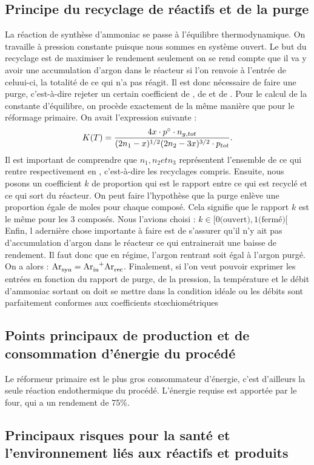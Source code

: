 \subsection{Principe du recyclage de réactifs et de la purge}
La réaction de synthèse d'ammoniac se passe à l'équilibre thermodynamique. On travaille à pression constante puisque nous sommes en système ouvert. Le but du recyclage est de maximiser le rendement seulement on se rend compte que il  va y avoir une accumulation d'argon dans le réacteur si l'on renvoie à l'entrée de celuui-ci, la totalité de ce qui n'a pas réagit. Il est donc nécessaire de faire une purge, c'est-à-dire rejeter un certain coefficient de , de  et de . Pour le calcul de la constante d'équilibre, on procède exactement de la même manière que pour le réformage primaire. 
On avait l'expression suivante : 
$$K(T) = \frac{4x\cdot p^{\circ} \cdot n_{g,tot}}{(2n_1 - x)^{1/2} (2n_2 - 3x)^{3/2} \cdot p_{tot}}.$$
Il est important de comprendre que $n_1, n_2 et n_3$ représentent l'ensemble de ce qui rentre respectivement en , c'est-à-dire les recyclages compris.
Ensuite, nous posons un coefficient $k$ de proportion qui est le rapport entre ce qui est recyclé et ce qui sort du réacteur. On peut faire l'hypothèse que la purge enlève une proportion égale de moles pour chaque composé. Cela signifie que le rapport $k$ est le même pour les 3 composés. Nous l'avions choisi : $k \in [0 \text{(ouvert)}, 1 \text{(fermé)}[$
Enfin, l adernière chose importante à  faire est de s'assurer qu'il n'y ait pas d'accumulation d'argon dans le réacteur ce qui entrainerait une baisse de rendement. Il faut donc que en régime, l'argon rentrant soit égal à l'argon purgé. On a alors : 
$\ce{Ar_{syn}} = \ce{Ar_{in}+Ar_{rec}}$. 
Finalement, si l'on veut pouvoir exprimer les entrées en fonction du rapport de purge, de la pression, la température et le débit d'ammoniac sortant on doit se mettre dans la condition idéale ou les débits sont parfaitement conformes aux coefficients stœchiométriques
 

\subsection{Points principaux de production et de consommation d'énergie du procédé}
Le réformeur primaire est le plus gros consommateur d'énergie, c'est d'ailleurs
la seule réaction endothermique du procédé. L'énergie requise est apportée par
le four, qui a un rendement de 75\%.

\subsection{Principaux risques pour la santé et l'environnement liés aux réactifs et produits}
